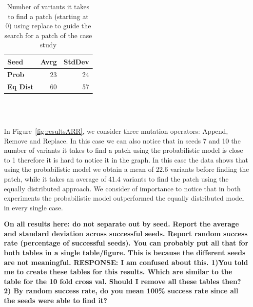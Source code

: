 \documentclass[conference]{IEEEtran}
\newcommand{\todo}[1]
  {{\scriptsize \textbf{\color{red} {#1}}}}
\begin{document}
\begin{table}[ht]
\begin{tabular}{lrr}
\hline
\textbf{Seed}& Avrg & StdDev  \\
\hline
\textbf{Prob} & 23 & 24 \\

\textbf{Eq Dist} & 60 & 57\\
\hline
\end{tabular}
\\
\\
\center
  \caption{Number of variants it takes to find a patch (starting at 0) using replace to guide the search for a patch of the case study}
  \label{fig:resultsReplace}
\end{table} 


In Figure~\ref{fig:resultsARR}, we consider three mutation operators: Append, 
Remove and Replace. In this case we can also notice that in seeds 7 and 10 the 
number of variants it takes to find a patch using the probabilistic model is 
close to 1 therefore it is hard to notice it in the graph. In this case the data 
shows that using the probabilistic model we obtain a mean of 22.6 variants 
before finding the patch, while it takes an average of 41.4 variants to find the 
patch using the equally distributed approach. We consider of importance to notice that in both experiments the probabilistic model outperformed the equally distributed model in every single case.

\todo{On all results here: do not separate out by seed.  Report the average and
  standard deviation across successful seeds.  Report random success rate
  (percentage of successful seeds).  You can probably put all that for both
  tables in a single table/figure.  This is because the different seeds are not meaningful. 
  RESPONSE: I am confused about this. 1)You told me to create these tables for this results. 
  Which are similar to the table for the 10 fold cross val. Should I remove all these tables then? 
  2) By random success rate, do you mean 100\% success rate since all the seeds were able to find it?}
\end{document}
